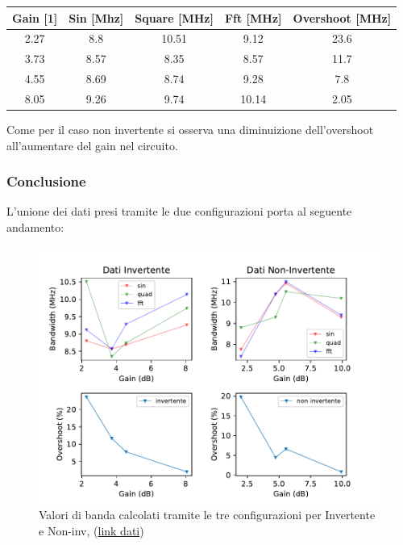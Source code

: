 \begin{table}[!h]
    \centering
    \begin{tabular}{|c|c|c|c|c|}
    \hline
    \textbf{Gain {[}1{]}} & \textbf{Sin {[}Mhz{]}} & \textbf{Square {[}MHz{]}} & \textbf{Fft {[}MHz{]}} & \textbf{Overshoot {[}MHz{]}} \\ \hline
    2.27                  & 8.8                    & 10.51                     & 9.12                   & 23.6                         \\ \hline
    3.73                  & 8.57                   & 8.35                      & 8.57                   & 11.7                         \\ \hline
    4.55                  & 8.69                   & 8.74                      & 9.28                   & 7.8                          \\ \hline
    8.05                  & 9.26                   & 9.74                      & 10.14                  & 2.05                         \\ \hline
    \end{tabular}
\end{table}


Come per il caso non invertente si osserva una diminuizione dell'overshoot all'aumentare del gain nel circuito. 

\subsubsection{Conclusione}

L'unione dei dati presi tramite le due configurazioni porta al seguente andamento:

\begin{figure}[!h]
    \centering
    \includegraphics[width=\linewidth]{analog/assets/OP27/Inv+Non-Inv.pdf}
    \caption{Valori di banda calcolati tramite le tre configurazioni per Invertente e Non-inv, (\href{https://github.com/Yedi278/Esperimentazioni-Elettronica/tree/main/-\%20OPAMP/OP27}{link dati})
    }
\end{figure}

